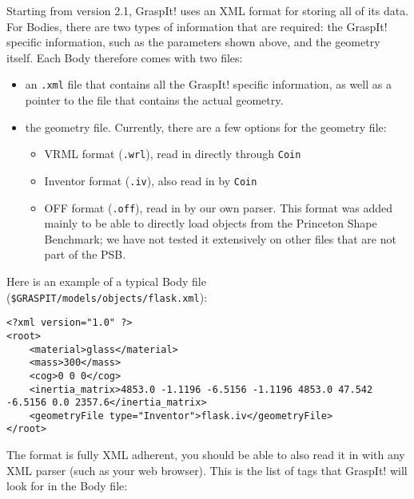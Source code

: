 Starting from version 2.1, GraspIt! uses an XML format for storing all
of its data. For Bodies, there are two types of information that are
required: the GraspIt! specific information, such as the parameters
shown above, and the geometry itself. Each Body therefore comes with two files:
\begin{itemize}
\item an \texttt{.xml} file that contains all the GraspIt! specific
  information, as well as a pointer to the file that contains the
  actual geometry.
\item the geometry file. Currently, there are a few options for the
  geometry file:
\begin{itemize}
\item VRML format (\texttt{.wrl}), read in directly through
  \texttt{Coin}
\item Inventor format (\texttt{.iv}), also read in by \texttt{Coin}
\item OFF format (\texttt{.off}), read in by our own parser. This
  format was added mainly to be able to directly load objects from the
  Princeton Shape Benchmark; we have not tested it extensively on
  other files that are not part of the PSB.
\end{itemize}
\end{itemize}

Here is an example of a typical Body file (\texttt{\$GRASPIT/models/objects/flask.xml}):

\begin{verbatim}
<?xml version="1.0" ?>
<root>
	<material>glass</material>
	<mass>300</mass>
	<cog>0 0 0</cog>
	<inertia_matrix>4853.0 -1.1196 -6.5156 -1.1196 4853.0 47.542 -6.5156 0.0 2357.6</inertia_matrix>
	<geometryFile type="Inventor">flask.iv</geometryFile>
</root>
\end{verbatim}

The format is fully XML adherent, you should be able to also read it
in with any XML parser (such as your web browser). This is the list of
tags that GraspIt! will look for in the Body file:

